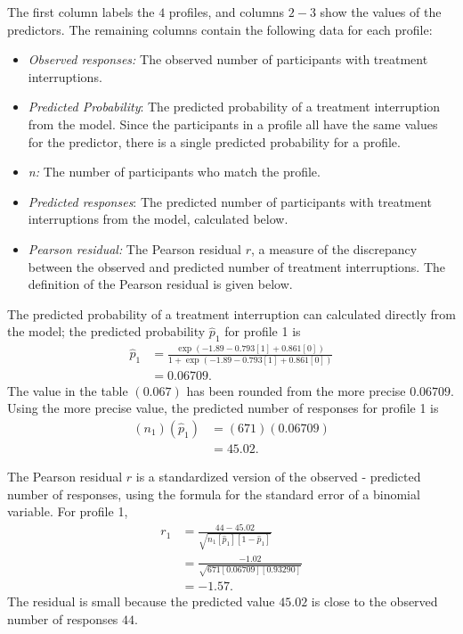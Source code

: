 The first column labels the $4$ profiles, and columns $2-3$ show the values of the predictors.  The remaining columns contain the following data for each profile:
\begin{itemize}

\item \textit{Observed responses:} The observed number of participants with treatment interruptions.

\item \textit{Predicted Probability}:  The predicted probability of a treatment interruption from the model.  Since the participants in a profile all have the same values for the predictor, there is a single predicted probability for a profile.

\item \textit{n:} The number of participants who match the profile.

\item \textit{Predicted responses}: The predicted number of participants with treatment interruptions from the model, calculated below.

\item \textit{Pearson residual:}  The Pearson residual $r$, a measure of the discrepancy between the observed and predicted number of treatment interruptions.  The definition of the Pearson residual is given below.

\end{itemize}

The predicted probability of a treatment interruption can calculated directly from the model; the predicted probability $\hat{p}_1$ for profile 1 is
\begin{align*}
     \hat{p}_1 &=   \frac{\exp(-1.89 - 0.793[1] + 0.861[0])}
       {1 + \exp(-1.89 - 0.793[1] + 0.861[0])} \\
       &= 0.06709.
\end{align*}
The value in the table $(0.067)$ has been rounded from the more precise $0.06709$.  Using the more precise value, the predicted number of responses for profile 1 is
\begin{align*}
    (n_1)(\hat{p}_1) &= (671)(0.06709) \\
    &= 45.02.
\end{align*}

The Pearson residual $r$ is a standardized version of the observed - predicted number of responses, using the formula for the standard error of a binomial variable.  For profile 1,
\begin{align*}
   r_1 &=  \frac{44 - 45.02}{\sqrt{n_1[\hat{p}_1][1 - \hat{p}_1]}} \\
       &= \frac{-1.02}{\sqrt{671[0.06709][0.93290]}} \\
       &= -1.57.
\end{align*}
The residual is small because the predicted value $45.02$ is close to the observed number of responses $44$.

